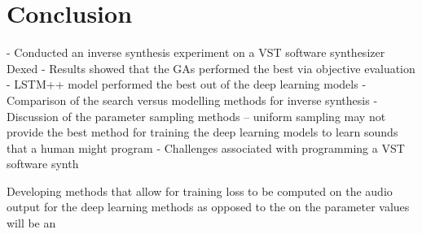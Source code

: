 
\section{Conclusion}

- Conducted an inverse synthesis experiment on a VST software synthesizer Dexed
- Results showed that the GAs performed the best via objective evaluation
- LSTM++ model performed the best out of the deep learning models
- Comparison of the search versus modelling methods for inverse synthesis
- Discussion of the parameter sampling methods -- uniform sampling may not provide the best method for training the deep learning models to learn sounds that a human might program
- Challenges associated with programming a VST software synth


Developing methods that allow for training loss to be computed on the audio output for the deep learning methods as opposed to the on the parameter values will be an 

